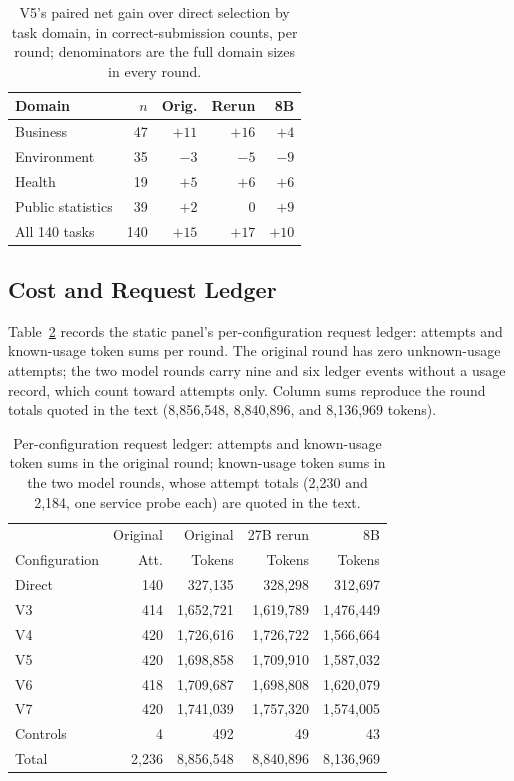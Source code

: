 \begin{table}[t]
\centering
\begin{tabular}{lrrrr}
\toprule
Domain & $n$ & Orig. & Rerun & 8B \\
\midrule
Business & 47 & $+11$ & $+16$ & $+4$ \\
Environment & 35 & $-3$ & $-5$ & $-9$ \\
Health & 19 & $+5$ & $+6$ & $+6$ \\
Public statistics & 39 & $+2$ & $0$ & $+9$ \\
\midrule
All 140 tasks & 140 & $+15$ & $+17$ & $+10$ \\
\bottomrule
\end{tabular}
\caption{V5's paired net gain over direct selection by
task domain, in correct-submission counts, per round;
denominators are the full domain sizes in every round.}
\label{tab:domain-strat}
\end{table}

\subsection{Cost and Request Ledger}\label{app:cost}

Table~\ref{tab:cost-ledger} records the static panel's
per-configuration request ledger: attempts and
known-usage token sums per round. The original round
has zero unknown-usage attempts; the two model rounds
carry nine and six ledger events without a usage
record, which count toward attempts only. Column sums
reproduce the round totals quoted in the text
(8{,}856{,}548, 8{,}840{,}896, and 8{,}136{,}969
tokens).

\begin{table}[t]
\centering
\small
\setlength{\tabcolsep}{3pt}
\begin{tabular}{lrrrr}
\toprule
 & Original & Original & 27B rerun & 8B \\
Configuration & Att. & Tokens & Tokens & Tokens \\
\midrule
Direct & 140 & 327{,}135 & 328{,}298 & 312{,}697 \\
V3 & 414 & 1{,}652{,}721 & 1{,}619{,}789 & 1{,}476{,}449 \\
V4 & 420 & 1{,}726{,}616 & 1{,}726{,}722 & 1{,}566{,}664 \\
V5 & 420 & 1{,}698{,}858 & 1{,}709{,}910 & 1{,}587{,}032 \\
V6 & 418 & 1{,}709{,}687 & 1{,}698{,}808 & 1{,}620{,}079 \\
V7 & 420 & 1{,}741{,}039 & 1{,}757{,}320 & 1{,}574{,}005 \\
Controls & 4 & 492 & 49 & 43 \\
\midrule
Total & 2{,}236 & 8{,}856{,}548 & 8{,}840{,}896 & 8{,}136{,}969 \\
\bottomrule
\end{tabular}
\caption{Per-configuration request ledger: attempts and
known-usage token sums in the original round;
known-usage token sums in the two model rounds, whose
attempt totals (2{,}230 and 2{,}184, one service probe
each) are quoted in the text.}
\label{tab:cost-ledger}
\end{table}

